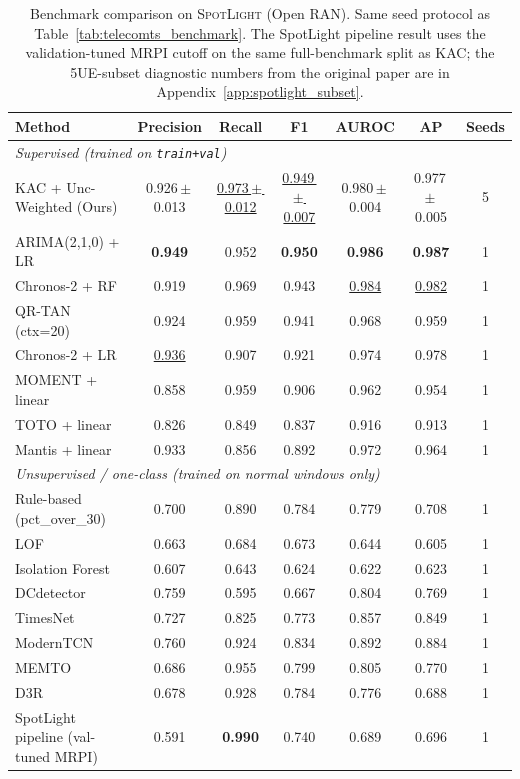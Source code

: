 \begin{table}[t]
  \caption{Benchmark comparison on \textsc{SpotLight} (Open RAN). Same seed protocol as Table~\ref{tab:telecomts_benchmark}. The SpotLight pipeline result uses the validation-tuned MRPI cutoff on the same full-benchmark split as KAC; the 5UE-subset diagnostic numbers from the original paper are in Appendix~\ref{app:spotlight_subset}.}
  \label{tab:spotlight_benchmark}
  \small
  \setlength{\tabcolsep}{4pt}
  \begin{tabular*}{\textwidth}{@{\extracolsep{\fill}}l|cccccc@{}}
    \toprule
    \textbf{Method} & \textbf{Precision} & \textbf{Recall} & \textbf{F1} & \textbf{AUROC} & \textbf{AP} & \textbf{Seeds} \\
    \midrule
    \multicolumn{7}{l}{\emph{Supervised (trained on \texttt{train+val})}} \\
    KAC + Unc-Weighted (Ours) & 0.926\,$\pm$\,0.013 & \underline{0.973\,$\pm$\,0.012} & \underline{0.949\,$\pm$\,0.007} & 0.980\,$\pm$\,0.004 & 0.977\,$\pm$\,0.005 & 5 \\
    ARIMA(2,1,0) + LR & \textbf{0.949} & 0.952 & \textbf{0.950} & \textbf{0.986} & \textbf{0.987} & 1 \\
    Chronos-2 + RF & 0.919 & 0.969 & 0.943 & \underline{0.984} & \underline{0.982} & 1 \\
    QR-TAN (ctx=20) & 0.924 & 0.959 & 0.941 & 0.968 & 0.959 & 1 \\
    Chronos-2 + LR & \underline{0.936} & 0.907 & 0.921 & 0.974 & 0.978 & 1 \\
    MOMENT + linear & 0.858 & 0.959 & 0.906 & 0.962 & 0.954 & 1 \\
    TOTO + linear & 0.826 & 0.849 & 0.837 & 0.916 & 0.913 & 1 \\
    Mantis + linear & 0.933 & 0.856 & 0.892 & 0.972 & 0.964 & 1 \\
    \midrule
    \multicolumn{7}{l}{\emph{Unsupervised / one-class (trained on normal windows only)}} \\
    Rule-based (pct\_over\_30) & 0.700 & 0.890 & 0.784 & 0.779 & 0.708 & 1 \\
    LOF & 0.663 & 0.684 & 0.673 & 0.644 & 0.605 & 1 \\
    Isolation Forest & 0.607 & 0.643 & 0.624 & 0.622 & 0.623 & 1 \\
    DCdetector & 0.759 & 0.595 & 0.667 & 0.804 & 0.769 & 1 \\
    TimesNet & 0.727 & 0.825 & 0.773 & 0.857 & 0.849 & 1 \\
    ModernTCN & 0.760 & 0.924 & 0.834 & 0.892 & 0.884 & 1 \\
    MEMTO & 0.686 & 0.955 & 0.799 & 0.805 & 0.770 & 1 \\
    D3R & 0.678 & 0.928 & 0.784 & 0.776 & 0.688 & 1 \\
    SpotLight pipeline (val-tuned MRPI) & 0.591 & \textbf{0.990} & 0.740 & 0.689 & 0.696 & 1 \\
    \bottomrule
  \end{tabular*}
\end{table}
